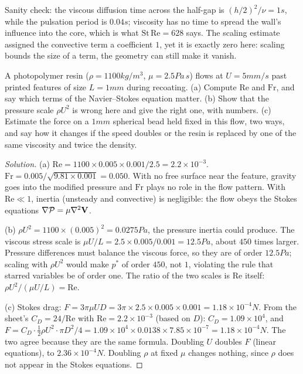 Sanity check: the viscous diffusion time across the half-gap is $(h/2)^2/\nu = 1\unit{s}$, while the pulsation period is $0.04\unit{s}$; viscosity has no time to spread the wall's influence into the core, which is what $\mathrm{St}\,\mathrm{Re} = 628$ says. The scaling estimate assigned the convective term a coefficient $1$, yet it is exactly zero here: scaling bounds the size of a term, the geometry can still make it vanish.

\begin{example}
A photopolymer resin ($\rho = 1100\unit{kg/m^3}$, $\mu = 2.5\unit{Pa\,s}$) flows at $U = 5\unit{mm/s}$ past printed features of size $L = 1\unit{mm}$ during recoating.
(a) Compute $\mathrm{Re}$ and $\mathrm{Fr}$, and say which terms of the Navier--Stokes equation matter.
(b) Show that the pressure scale $\rho U^2$ is wrong here and give the right one, with numbers.
(c) Estimate the force on a $1\unit{mm}$ spherical bead held fixed in this flow, two ways, and say how it changes if the speed doubles or the resin is replaced by one of the same viscosity and twice the density.
\end{example}

\begin{proof}[Solution]
(a) $\mathrm{Re} = 1100 \times 0.005 \times 0.001/2.5 = 2.2\times10^{-3}$. $\mathrm{Fr} = 0.005/\sqrt{9.81 \times 0.001} = 0.050$. With no free surface near the feature, gravity goes into the modified pressure and $\mathrm{Fr}$ plays no role in the flow pattern. With $\mathrm{Re} \ll 1$, inertia (unsteady and convective) is negligible: the flow obeys the Stokes equations $\nabla\mathcal{P} = \mu\nabla^2\mathbf{V}$.

(b) $\rho U^2 = 1100 \times (0.005)^2 = 0.0275\unit{Pa}$, the pressure inertia could produce. The viscous stress scale is $\mu U/L = 2.5 \times 0.005/0.001 = 12.5\unit{Pa}$, about $450$ times larger. Pressure differences must balance the viscous force, so they are of order $12.5\unit{Pa}$; scaling with $\rho U^2$ would make $p^*$ of order $450$, not $1$, violating the rule that starred variables be of order one. The ratio of the two scales is $\mathrm{Re}$ itself: $\rho U^2/(\mu U/L) = \mathrm{Re}$.

(c) Stokes drag: $F = 3\pi\mu U D = 3\pi \times 2.5 \times 0.005 \times 0.001 = 1.18\times10^{-4}\unit{N}$. From the sheet's $C_D = 24/\mathrm{Re}$ with $\mathrm{Re} = 2.2\times10^{-3}$ (based on $D$): $C_D = 1.09\times10^4$, and $F = C_D \cdot \tfrac12\rho U^2 \cdot \pi D^2/4 = 1.09\times10^4 \times 0.0138 \times 7.85\times10^{-7} = 1.18\times10^{-4}\unit{N}$. The two agree because they are the same formula. Doubling $U$ doubles $F$ (linear equations), to $2.36\times10^{-4}\unit{N}$. Doubling $\rho$ at fixed $\mu$ changes nothing, since $\rho$ does not appear in the Stokes equations.
\end{proof}

